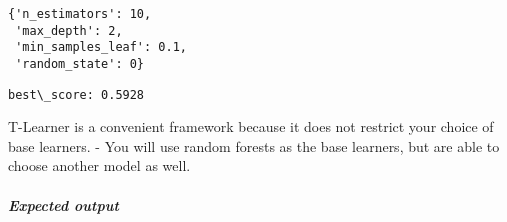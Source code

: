 \documentclass[11pt]{article}
\begin{document}
    
    \begin{verbatim}
{'n_estimators': 10,
 'max_depth': 2,
 'min_samples_leaf': 0.1,
 'random_state': 0}
    \end{verbatim}

    
    \begin{Verbatim}[commandchars=\\\{\}]
best\_score: 0.5928

    \end{Verbatim}

    T-Learner is a convenient framework because it does not restrict your
choice of base learners. - You will use random forests as the base
learners, but are able to choose another model as well.

    \hypertarget{expected-output}{%
\subparagraph{Expected output}\label{expected-output}}
\end{document}
